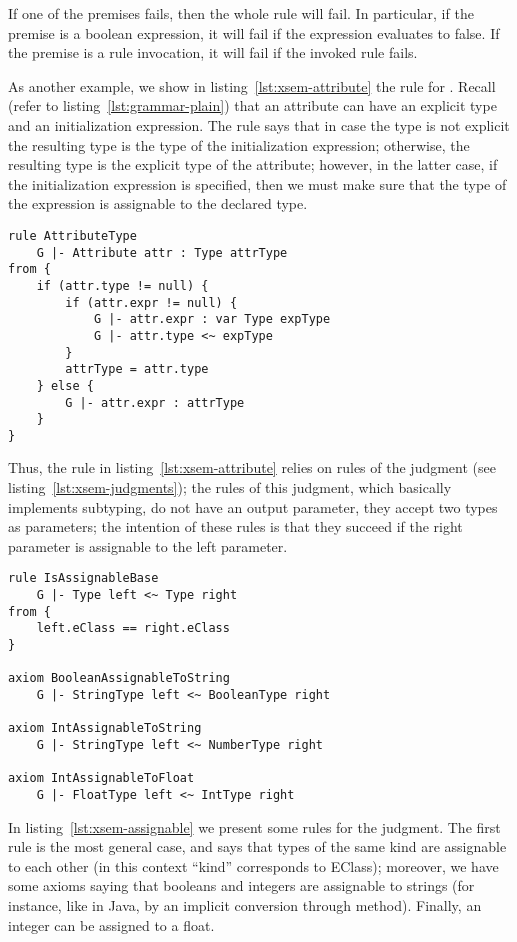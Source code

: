 If one of the premises fails, then the whole rule will fail.
In particular, if the premise is a boolean expression, it will fail if the
expression evaluates to false.  If the premise is a rule invocation, it will
fail if the invoked rule fails.

As another example, we show in listing~\ref{lst:xsem-attribute} the rule for
.  Recall (refer to listing~\ref{lst:grammar-plain}) that an
attribute can have an explicit type and an initialization expression. The rule
says that in case the type is not explicit the resulting type is the type of the
initialization expression; otherwise, the resulting type is the explicit type of
the attribute; however, in the latter case, if the initialization expression is
specified, then we must make sure that the type of the expression is assignable
to the declared type.

\begin{lstlisting}[language=xsemantics,float,label=lst:xsem-attribute,caption=Type
rule for \mytt{Attribute}.] 
rule AttributeType 
	G |- Attribute attr : Type attrType 
from {
	if (attr.type != null) {
		if (attr.expr != null) {
			G |- attr.expr : var Type expType
			G |- attr.type <~ expType
		}
		attrType = attr.type
	} else {
		G |- attr.expr : attrType
	}
}
\end{lstlisting}

Thus, the rule in listing~\ref{lst:xsem-attribute} relies on rules of the
judgment  (see listing~\ref{lst:xsem-judgments}); the rules
of this judgment, which basically implements subtyping, do not have an output
parameter, they accept two types as parameters; the intention of these rules is
that they succeed if the right parameter is assignable to the left parameter.

\begin{lstlisting}[language=xsemantics,float,label=lst:xsem-assignable,caption=Some
rules for the \mytt{isAssignable} judgment.] 
rule IsAssignableBase
	G |- Type left <~ Type right
from {
	left.eClass == right.eClass
}

axiom BooleanAssignableToString
	G |- StringType left <~ BooleanType right

axiom IntAssignableToString
	G |- StringType left <~ NumberType right

axiom IntAssignableToFloat
	G |- FloatType left <~ IntType right
\end{lstlisting}

In listing~\ref{lst:xsem-assignable} we present some rules for the
 judgment.  The first rule is the most general case, and says
that types of the same kind are assignable to each other (in this context
``kind'' corresponds to EClass); moreover, we have some axioms saying that
booleans and integers are assignable to strings (for instance, like in Java, by
an implicit conversion through  method).  Finally, an integer can
be assigned to a float.

